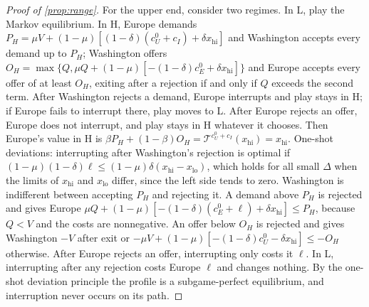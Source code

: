 \begin{proof}[Proof of \cref{prop:range}]
For the upper end, consider two regimes. In L, play the Markov equilibrium. In H, Europe demands $P_H=\mu V+(1-\mu)[(1-\delta)(c^0_U+c_I)+\delta x_{\mathrm{hi}}]$ and Washington accepts every demand up to $P_H$; Washington offers $O_H=\max\{Q,\mu Q+(1-\mu)[-(1-\delta)c^0_E+\delta x_{\mathrm{hi}}]\}$ and Europe accepts every offer of at least $O_H$, exiting after a rejection if and only if $Q$ exceeds the second term. After Washington rejects a demand, Europe interrupts and play stays in H; if Europe fails to interrupt there, play moves to L. After Europe rejects an offer, Europe does not interrupt, and play stays in H whatever it chooses. Then Europe's value in H is $\beta P_H+(1-\beta)O_H=\mathcal T^{c^0_U+c_I}(x_{\mathrm{hi}})=x_{\mathrm{hi}}$. One-shot deviations: interrupting after Washington's rejection is optimal if $(1-\mu)(1-\delta)\ell\le(1-\mu)\delta(x_{\mathrm{hi}}-x_{\mathrm{lo}})$, which holds for all small $\Delta$ when the limits of $x_{\mathrm{hi}}$ and $x_{\mathrm{lo}}$ differ, since the left side tends to zero. Washington is indifferent between accepting $P_H$ and rejecting it. A demand above $P_H$ is rejected and gives Europe $\mu Q+(1-\mu)[-(1-\delta)(c^0_E+\ell)+\delta x_{\mathrm{hi}}]\le P_H$, because $Q<V$ and the costs are nonnegative. An offer below $O_H$ is rejected and gives Washington $-V$ after exit or $-\mu V+(1-\mu)[-(1-\delta)c^0_U-\delta x_{\mathrm{hi}}]\le-O_H$ otherwise. After Europe rejects an offer, interrupting only costs it $\ell$. In L, interrupting after any rejection costs Europe $\ell$ and changes nothing. By the one-shot deviation principle the profile is a subgame-perfect equilibrium, and interruption never occurs on its path.
\end{proof}
